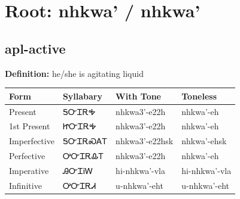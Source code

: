 \documentclass{article}%
\begin{document}
%
\normalsize%
\section*{Root: nhkwa' / nhkwa'}%
\subsection*{apl-active}%
\textbf{Definition: }%
he/she is agitating liquid%
\\[0.5em]%
\begin{tabular}{|l|l|l|l|}%
\hline%
\textbf{Form}&\textbf{Syllabary}&\textbf{With Tone}&\textbf{Toneless}\\%
\hline%
Present&ᎦᏅᏆᎡᎭ&nhkwa3'{-}e22h&nhkwa'{-}eh\\%
1st Present&ᏥᏅᏆᎡᎭ&nhkwa3'{-}e22h&nhkwa'{-}eh\\%
Imperfective&ᎦᏅᏆᎡᏍᎪᎢ&nhkwa3'{-}e22hsk&nhkwa'{-}ehsk\\%
Perfective&ᎤᏅᏆᎡᎲᎢ&nhkwa3'{-}e22h&nhkwa'{-}eh\\%
Imperative&ᎯᏅᏆᎥᎳ&hi{-}nhkwa'{-}vla&hi{-}nhkwa'{-}vla\\%
Infinitive&ᎤᏅᏆᎡᏗ&u{-}nhkwa'{-}eht&u{-}nhkwa'{-}eht\\%
\hline%
\end{tabular}%
\\[1em]%
\end{document}

